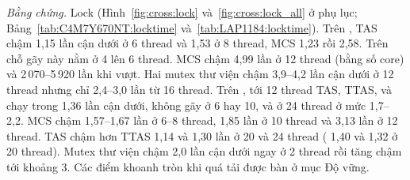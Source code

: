 \emph{Bằng chứng.} Lock (Hình~\ref{fig:cross:lock} và~\ref{fig:cross:lock_all} ở phụ lục; Bảng~\ref{tab:C4M7Y670NT:locktime}
và~\ref{tab:LAP1184:locktime}). Trên , TAS chậm 1,15 lần cận dưới ở 6 thread và 1,53
ở 8 thread, MCS 1,23 rồi 2,58. Trên  chỗ gãy này nằm ở 4 lên 6 thread. MCS chậm 4,99 lần
ở 12 thread (bằng số core) và 2\,070--5\,920 lần khi vượt. Hai mutex thư viện chậm 3,9--4,2 lần cận
dưới ở 12 thread nhưng chỉ 2,4--3,0 lần từ 16 thread. Trên , tới 12 thread TAS, TTAS,  và
 chạy trong 1,36 lần cận dưới, không gãy ở 6 hay 10, và ở 24 thread ở mức 1,7--2,2. MCS
chậm 1,57--1,67 lần ở 6--8 thread, 1,85 lần ở 10 thread và 3,13 lần ở 12 thread. TAS chậm hơn
TTAS 1,14 và 1,30 lần ở 20 và 24 thread ( 1,40 và  1,32 ở 20 thread).
Mutex thư viện chậm 2,0 lần cận dưới ngay ở 2 thread rồi tăng chậm tới khoảng 3. Các điểm khoanh tròn
khi quá tải được bàn ở mục Độ vững.

